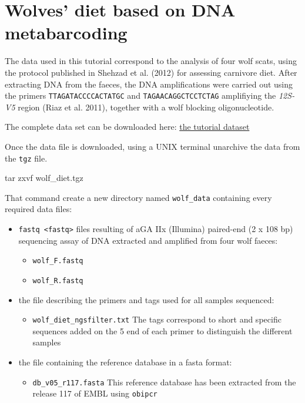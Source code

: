 \documentclass[
  letterpaper,
  DIV=11,
  numbers=noendperiod]{scrreprt}
\newenvironment{Shaded}{\begin{snugshade}}{\end{snugshade}}
\newcommand{\FunctionTok}[1]{\textcolor[rgb]{0.28,0.35,0.67}{#1}}
\newcommand{\NormalTok}[1]{\textcolor[rgb]{0.00,0.23,0.31}{#1}}
\providecommand{\tightlist}{%
  \setlength{\itemsep}{0pt}\setlength{\parskip}{0pt}}\usepackage{longtable,booktabs,array}
\begin{document}
\hypertarget{wolves-diet-based-on-dna-metabarcoding}{%
\section{Wolves' diet based on DNA
metabarcoding}\label{wolves-diet-based-on-dna-metabarcoding}}

The data used in this tutorial correspond to the analysis of four wolf
scats, using the protocol published in Shehzad et al. (2012) for
assessing carnivore diet. After extracting DNA from the faeces, the DNA
amplifications were carried out using the primers
\texttt{TTAGATACCCCACTATGC} and \texttt{TAGAACAGGCTCCTCTAG} amplifiying
the \emph{12S-V5} region (Riaz et al. 2011), together with a wolf
blocking oligonucleotide.

The complete data set can be downloaded here: \href{wolf_diet.tgz}{the
tutorial dataset}

Once the data file is downloaded, using a UNIX terminal unarchive the
data from the \texttt{tgz} file.

\begin{Shaded}
\begin{Highlighting}[]
\FunctionTok{tar}\NormalTok{ zxvf wolf\_diet.tgz}
\end{Highlighting}
\end{Shaded}

That command create a new directory named \texttt{wolf\_data} containing
every required data files:

\begin{itemize}
\item
  \texttt{fastq\ \textless{}fastq\textgreater{}} files resulting of aGA
  IIx (Illumina) paired-end (2 x 108 bp) sequencing assay of DNA
  extracted and amplified from four wolf faeces:

  \begin{itemize}
  \tightlist
  \item
    \texttt{wolf\_F.fastq}
  \item
    \texttt{wolf\_R.fastq}
  \end{itemize}
\item
  the file describing the primers and tags used for all samples
  sequenced:

  \begin{itemize}
  \tightlist
  \item
    \texttt{wolf\_diet\_ngsfilter.txt} The tags correspond to short and
    specific sequences added on the 5\textquotesingle{} end of each
    primer to distinguish the different samples
  \end{itemize}
\item
  the file containing the reference database in a fasta format:

  \begin{itemize}
  \tightlist
  \item
    \texttt{db\_v05\_r117.fasta} This reference database has been
    extracted from the release 117 of EMBL using \texttt{obipcr}
  \end{itemize}
\end{itemize}
\end{document}

